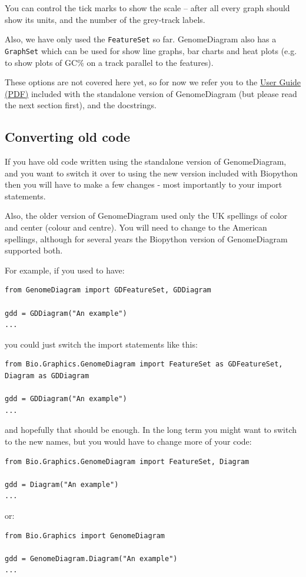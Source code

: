 You can control the tick marks to show the scale -- after all every graph
should show its units, and the number of the grey-track labels.

Also, we have only used the \verb|FeatureSet| so far. GenomeDiagram also has
a \verb|GraphSet| which can be used for show line graphs, bar charts and heat
plots (e.g. to show plots of GC\% on a track parallel to the features).

These options are not covered here yet, so for now we refer you to the
\href{http://biopython.org/DIST/docs/GenomeDiagram/userguide.pdf}
{User Guide (PDF)} included with the standalone version of GenomeDiagram (but
please read the next section first), and the docstrings.

\subsection{Converting old code}

If you have old code written using the standalone version of GenomeDiagram, and
you want to switch it over to using the new version included with Biopython then
you will have to make a few changes - most importantly to your import statements.

Also, the older version of GenomeDiagram used only the UK spellings of color and
center (colour and centre).  You will need to change to the American spellings,
although for several years the Biopython version of GenomeDiagram supported both.

For example, if you used to have:
\begin{verbatim}
from GenomeDiagram import GDFeatureSet, GDDiagram

gdd = GDDiagram("An example")
...
\end{verbatim}
you could just switch the import statements like this:
\begin{verbatim}
from Bio.Graphics.GenomeDiagram import FeatureSet as GDFeatureSet, Diagram as GDDiagram

gdd = GDDiagram("An example")
...
\end{verbatim}
and hopefully that should be enough.  In the long term you might want to
switch to the new names, but you would have to change more of your code:
\begin{verbatim}
from Bio.Graphics.GenomeDiagram import FeatureSet, Diagram

gdd = Diagram("An example")
...
\end{verbatim}
or:
\begin{verbatim}
from Bio.Graphics import GenomeDiagram

gdd = GenomeDiagram.Diagram("An example")
...
\end{verbatim}

